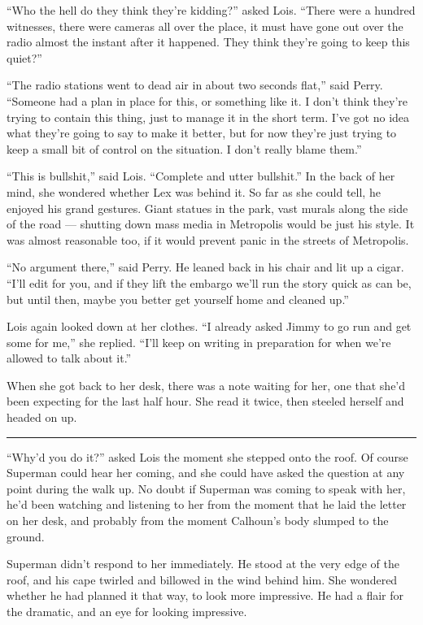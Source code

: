``Who the hell do they think they're kidding?'' asked Lois. ``There were
a hundred witnesses, there were cameras all over the place, it must have
gone out over the radio almost the instant after it happened. They think
they're going to keep this quiet?''

``The radio stations went to dead air in about two seconds flat,'' said
Perry. ``Someone had a plan in place for this, or something like it. I
don't think they're trying to contain this thing, just to manage it in
the short term. I've got no idea what they're going to say to make it
better, but for now they're just trying to keep a small bit of control
on the situation. I don't really blame them.''

``This is bullshit,'' said Lois. ``Complete and utter bullshit.'' In the
back of her mind, she wondered whether Lex was behind it. So far as she
could tell, he enjoyed his grand gestures. Giant statues in the park,
vast murals along the side of the road --- shutting down mass media in
Metropolis would be just his style. It was almost reasonable too, if it
would prevent panic in the streets of Metropolis.

``No argument there,'' said Perry. He leaned back in his chair and lit
up a cigar. ``I'll edit for you, and if they lift the embargo we'll run
the story quick as can be, but until then, maybe you better get yourself
home and cleaned up.''

Lois again looked down at her clothes. ``I already asked Jimmy to go run
and get some for me,'' she replied. ``I'll keep on writing in
preparation for when we're allowed to talk about it.''

When she got back to her desk, there was a note waiting for her, one
that she'd been expecting for the last half hour. She read it twice,
then steeled herself and headed on up.

\begin{center}\rule{0.5\linewidth}{0.5pt}\end{center}

``Why'd you do it?'' asked Lois the moment she stepped onto the roof. Of
course Superman could hear her coming, and she could have asked the
question at any point during the walk up. No doubt if Superman was
coming to speak with her, he'd been watching and listening to her from
the moment that he laid the letter on her desk, and probably from the
moment Calhoun's body slumped to the ground.

Superman didn't respond to her immediately. He stood at the very edge of
the roof, and his cape twirled and billowed in the wind behind him. She
wondered whether he had planned it that way, to look more impressive. He
had a flair for the dramatic, and an eye for looking impressive.

